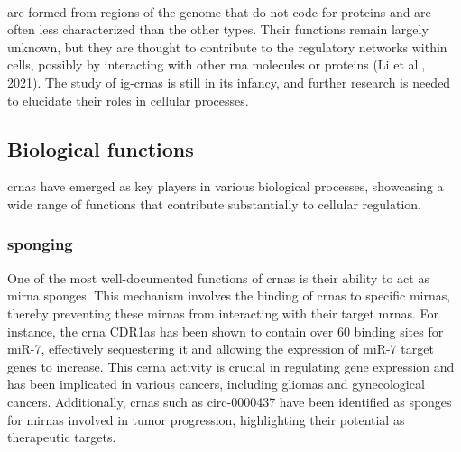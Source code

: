\paragraph{} are formed from regions of
the
genome
that do not code for proteins and are often less characterized than the other
types.
Their functions remain largely unknown, but they are thought to contribute to
the regulatory networks within cells, possibly by interacting with other
\gls{rna} molecules or proteins (Li et al., 2021).
The study of \glspl{ig-crna} is still in its infancy, and further research is
needed to elucidate their roles in cellular processes.

\subsection{Biological functions}
\label{sec:circrna_functions}
\glspl{crna} have emerged as key players in various biological processes,
showcasing
a wide range of functions that contribute substantially to cellular regulation.

\subsubsection{ sponging}
One of the most well-documented functions of \glspl{crna} is their ability to
act as \gls{mirna} sponges.
This mechanism involves the binding of \glspl{crna} to specific \glspl{mirna},
thereby preventing these \glspl{mirna} from interacting with their target
\glspl{mrna}.
For instance, the \gls{crna} CDR1as has been shown to contain over 60 binding
sites for miR-7, effectively sequestering it and allowing the expression of
miR-7 target genes to
increase\supercite{guo_expanded_2014,yuan_regulatory_2020}.
This \gls{cerna} activity is crucial in regulating gene expression and has been
implicated in various cancers, including gliomas and gynecological
cancers\supercite{dong_expression_2020,song_circular_2016}.
Additionally, \glspl{crna} such as circ-0000437 have been identified as sponges
for \glspl{mirna} involved in tumor progression, highlighting their potential
as therapeutic targets\supercite{li_peptide_2021,cui_circular_2022}.

